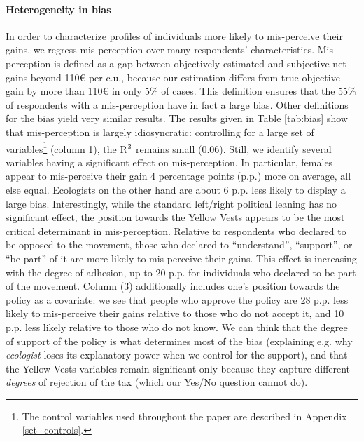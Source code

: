 \documentclass[11pt]{article}
\begin{document}
\paragraph{Heterogeneity in bias}
In order to characterize profiles of individuals more likely to mis-perceive their gains, we regress mis-perception over many respondents' characteristics. Mis-perception is defined as a gap between objectively estimated and subjective net gains beyond 110\euro{} per c.u., because our estimation differs from true objective gain by more than 110\euro{} in only 5\% of cases. This definition ensures that the 55\% of respondents with a mis-perception have in fact a large bias. Other definitions for the bias yield very similar results. The results given in Table \ref{tab:bias} show that mis-perception is largely idiosyncratic: controlling for a large set of variables\footnote{The control variables used throughout the paper are described in Appendix \ref{set_controls}.} (column 1), the R$^\textnormal{2}$ remains small (0.06). Still, we identify several variables having a significant effect on mis-perception. In particular, females appear to mis-perceive their gain 4 percentage points (p.p.) more on average, all else equal. Ecologists on the other hand are about 6 p.p. less likely to display a large bias. Interestingly, while the standard left/right political leaning has no significant effect, the position towards the Yellow Vests appears to be the most critical determinant in mis-perception. Relative to respondents who declared to be opposed to the movement, those who declared to ``understand'', ``support'', or ``be part'' of it are more likely to mis-perceive their gains. This effect is increasing with the degree of adhesion, up to 20 p.p. for individuals who declared to be part of the movement. Column (3) additionally includes one's position towards the policy as a covariate: we see that people who approve the policy are 28 p.p. less likely to mis-perceive their gains relative to those who do not accept it, and 10 p.p. less likely relative to those who do not know. We can think that the degree of support of the policy is what determines most of the bias (explaining e.g. why \textit{ecologist} loses its explanatory power when we control for the support), and that the Yellow Vests variables remain significant only because they capture different \textit{degrees} of rejection of the tax (which our Yes/No question cannot do).  %
\end{document}
